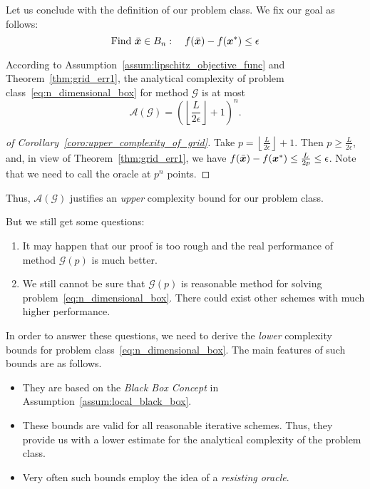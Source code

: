 Let us conclude with the definition of our problem class. We fix our goal as follows:
\begin{equation}\label{eq:goal_n_box}
    \text{Find} ~ \bar{\bm{x}} \in B_n : \quad f(\bar{\bm{x}}) - f(\bm{x}^*) \le \epsilon
\end{equation}

\begin{coro}\label{coro:upper_complexity_of_grid}
    According to Assumption~\ref{assum:lipschitz_objective_func} and
    Theorem~\ref{thm:grid_err1}, the analytical complexity of problem 
    class~\ref{eq:n_dimensional_box} for method \(\mathscr{G}\) is at most
    \[
        \mathscr{A}(\mathscr{G}) = \left( \left\lfloor \frac{L}{2\epsilon} \right\rfloor +1 \right)^n .
    \]
\end{coro}

\begin{proof}[of Corollary~\ref{coro:upper_complexity_of_grid}]
    Take \(p = \left\lfloor \frac{L}{2\epsilon} \right\rfloor +1\). Then \(p \ge \frac{L}{2\epsilon}\), and, in view of Theorem~\ref{thm:grid_err1}, 
    we have \(f(\bar{\bm{x}}) - f(\bm{x}^*) \le \frac{L}{2p} \le \epsilon\). Note that we need to call the oracle at \(p^n\) points.
\end{proof}

Thus, \(\mathscr{A}(\mathscr{G})\) justifies an \emph{upper} complexity bound for our problem class.

But we still get some questions:
\begin{enumerate}
    \item It may happen that our proof is too rough and the real performance of method \(\mathscr{G}(p)\) is much better.
    \item We still cannot be sure that \(\mathscr{G}(p)\) is reasonable method for solving problem~\ref{eq:n_dimensional_box}. There could exist other schemes with much higher performance.
\end{enumerate}
In order to answer these questions, we need to derive the \emph{lower} complexity bounds for problem class~\ref{eq:n_dimensional_box}. The main features of such bounds are as follows.
\begin{itemize}
    \item They are based on the \emph{Black Box Concept} in Assumption~\ref{assum:local_black_box}.
    \item These bounds are valid for all reasonable iterative schemes. Thus, they provide us with a lower estimate for the analytical complexity of the problem class.
    \item Very often such bounds employ the idea of a \emph{resisting oracle}.
\end{itemize}

